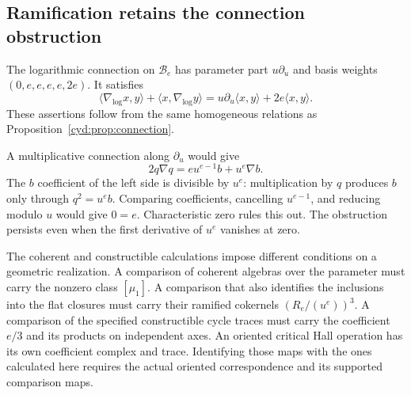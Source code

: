 \subsection{Ramification retains the connection obstruction}

The logarithmic connection on \(\mathcal B_e\) has parameter
part \(u\partial_u\) and basis weights
\((0,e,e,e,e,2e)\). It satisfies
\[
 \langle\nabla_{\log}x,y\rangle+
 \langle x,\nabla_{\log}y\rangle
       =u\partial_u\langle x,y\rangle+2e\langle x,y\rangle.
\]
These assertions follow from the same homogeneous relations
as Proposition~\ref{cyd:prop:connection}.

A multiplicative connection along \(\partial_u\) would give
\[
           2q\nabla q=e u^{e-1}b+u^e\nabla b.
\]
The \(b\) coefficient of the left side is divisible by
\(u^e\): multiplication by \(q\) produces \(b\) only
through \(q^2=u^eb\).
Comparing coefficients, cancelling \(u^{e-1}\), and
reducing modulo \(u\) would give \(0=e\).
Characteristic zero rules this out. The obstruction persists
even when the first derivative of \(u^e\) vanishes at zero.

The coherent and constructible calculations impose different
conditions on a geometric realization. A comparison of
coherent algebras over the parameter must carry the nonzero
class \([\mu_1]\). A comparison that also identifies the
inclusions into the flat closures must carry their ramified
cokernels \((R_e/(u^e))^3\). A comparison of the specified
constructible cycle traces must carry the coefficient
\(e/3\) and its products on independent axes.
An oriented critical Hall operation has its own coefficient
complex and trace. Identifying those maps with the ones
calculated here requires the actual oriented correspondence
and its supported comparison maps.

